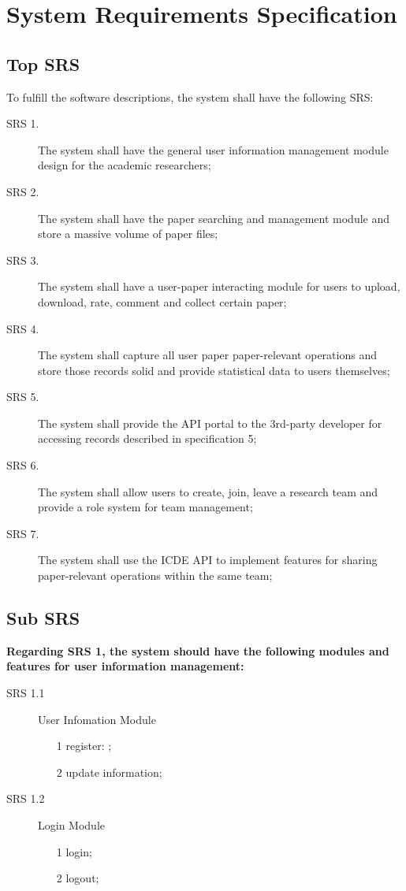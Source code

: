 \newpage

\section{System Requirements Specification}
\noindent

\subsection*{Top SRS}
To fulfill the software descriptions, the system shall have the following SRS:

\begin{description}
	\item [SRS 1.] The system shall have the general user information management module design for the academic researchers;
	\item [SRS 2.] The system shall have the paper searching and management module and store a massive volume of paper files;
	\item [SRS 3.] The system shall have a user-paper interacting module for users to upload, download, rate, comment and collect certain paper;
	\item [SRS 4.] The system shall capture all user paper paper-relevant operations and store those records solid and provide statistical data to users themselves;
	\item [SRS 5.] The system shall provide the API portal to the 3rd-party developer for accessing records described in specification 5;
	\item [SRS 6.] The system shall allow users to create, join, leave a research team and provide a role system for team management;
	\item [SRS 7.] The system shall use the ICDE API to implement features for sharing paper-relevant operations within the same team;
\end{description}


\subsection*{Sub SRS}
\noindent
\textbf{Regarding SRS 1, the system should have the following modules and features for user information management:}

\begin{description}
	\item[SRS 1.1] User Infomation Module
		\begin{itemize}
			\item [1]
			      register: ;
			\item [2]
			      update information;
		\end{itemize}
	\item[SRS 1.2] Login Module
		\begin{itemize}
			\item [1]
			      login;
			\item [2]
			      logout;
		\end{itemize}
\end{description}

